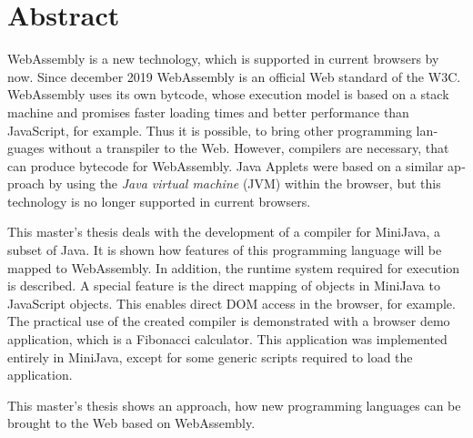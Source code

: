 \chapter{Abstract}


\begin{english}
WebAssembly is a new technology, which is supported in current browsers by now. Since december 2019 WebAssembly is an official Web standard of the W3C. WebAssembly uses its own bytcode, whose execution model is based on a stack machine and promises faster loading times and better performance than JavaScript, for example. Thus it is possible, to bring other programming languages without a transpiler to the Web. However, compilers are necessary, that can produce bytecode for WebAssembly. Java Applets were based on a similar approach by using the \emph{Java virtual machine} (JVM) within the browser, but this technology is no longer supported in current browsers.

This master's thesis deals with the development of a compiler for MiniJava, a subset of Java. It is shown how features of this programming language will be mapped to WebAssembly. In addition, the runtime system required for execution is described. A special feature is the direct mapping of objects in MiniJava to JavaScript objects. This enables direct DOM access in the browser, for example. The practical use of the created compiler is demonstrated with a browser demo application, which is a Fibonacci calculator. This application was implemented entirely in MiniJava, except for some generic scripts required to load the application.

This master's thesis shows an approach, how new programming languages can be brought to the Web based on WebAssembly.
\end{english}
